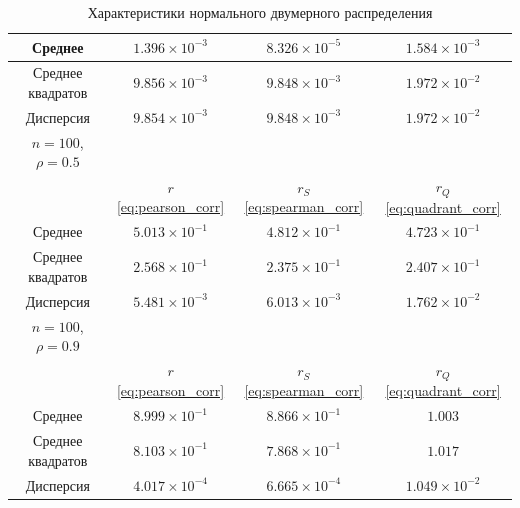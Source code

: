 \documentclass[12pt,a4paper]{article}
\begin{document}
\begin{table}[htbp!]
\begin{tabular}{ |c|c|c|c| }
			\hline
			Среднее & \( 1.396 \times 10^{-3} \) & \( 8.326 \times 10^{-5} \) &
			\( 1.584 \times 10^{-3} \) \\
			\hline
			Среднее квадратов & \( 9.856 \times 10^{-3} \) &
			\( 9.848 \times 10^{-3} \) & \( 1.972 \times 10^{-2} \) \\
			\hline
			Дисперсия & \( 9.854 \times 10^{-3} \) &
			\( 9.848 \times 10^{-3} \) & \( 1.972 \times 10^{-2} \) \\
			\hline
			\hline
			\( n = 100 \), \( \rho = 0.5 \) & & & \\
			\hline
			& \( r \) \eqref{eq:pearson_corr} & \( r_S \) \eqref{eq:spearman_corr} &
			\( r_Q \) \eqref{eq:quadrant_corr} \\
			\hline
			Среднее & \( 5.013 \times 10^{-1} \) & \( 4.812 \times 10^{-1} \) &
			\( 4.723 \times 10^{-1} \) \\
			\hline
			Среднее квадратов & \( 2.568 \times 10^{-1} \) &
			\( 2.375 \times 10^{-1} \) & \( 2.407 \times 10^{-1} \) \\
			\hline
			Дисперсия & \( 5.481 \times 10^{-3} \) &
			\( 6.013 \times 10^{-3} \) & \( 1.762 \times 10^{-2} \) \\
			\hline
			\hline
			\( n = 100 \), \( \rho = 0.9 \) & & & \\
			\hline
			& \( r \) \eqref{eq:pearson_corr} & \( r_S \) \eqref{eq:spearman_corr} &
			\( r_Q \) \eqref{eq:quadrant_corr} \\
			\hline
			Среднее & \( 8.999 \times 10^{-1} \) & \( 8.866 \times 10^{-1} \) &
			\( 1.003 \) \\
			\hline
			Среднее квадратов & \( 8.103 \times 10^{-1} \) &
			\( 7.868 \times 10^{-1} \) & \( 1.017 \) \\
			\hline
			Дисперсия & \( 4.017 \times 10^{-4} \) &
			\( 6.665 \times 10^{-4} \) & \( 1.049 \times 10^{-2} \) \\
			\hline
		\end{tabular}
		\caption{Характеристики нормального двумерного распределения}
	\end{table}
\end{document}
